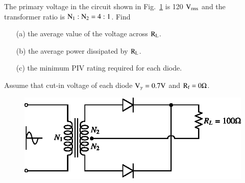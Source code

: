 \begin{problem}\label{prob1.11}
The primary voltage in the circuit shown in Fig.~\ref{fig1.34} is 120 $\textrm{V}_{\text{rms}}$ and the transformer ratio is $\textrm{N}_{1}:\textrm{N}_{2}=4:1$. Find
\begin{itemize}
\item[(a)] the average value of the voltage across $\textrm{R}_{\textrm{L}}$.

\item[(b)] the average power dissipated by $\textrm{R}_{\textrm{L}}$.

\item[(c)] the minimum PIV rating required for each diode.
\end{itemize}
Assume that cut-in voltage of each diode $\textrm{V}_{\gamma}=0.7\textrm{V}$ and $\textrm{R}_{\textrm{f}}=0\Omega$.
\begin{figure}[H]
\centering
\includegraphics{chap1/fig1.34.eps}
\caption{}\label{fig1.34}
\end{figure}
\end{problem}

